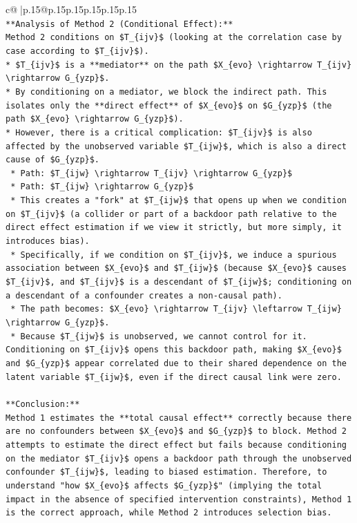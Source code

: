 \documentclass{article}
\begin{document}
{\begin{supertabular}{c@{$\;$}|p{.15\linewidth}@{}p{.15\linewidth}p{.15\linewidth}p{.15\linewidth}p{.15\linewidth}p{.15\linewidth}}
{{{\\ 
\texttt{**Analysis of Method 2 (Conditional Effect):**} \\
\texttt{Method 2 conditions on \$T\_\{ijv\}\$ (looking at the correlation case by case according to \$T\_\{ijv\}\$).} \\
\texttt{*   \$T\_\{ijv\}\$ is a **mediator** on the path \$X\_\{evo\} \textbackslash{}rightarrow T\_\{ijv\} \textbackslash{}rightarrow G\_\{yzp\}\$.} \\
\texttt{*   By conditioning on a mediator, we block the indirect path. This isolates only the **direct effect** of \$X\_\{evo\}\$ on \$G\_\{yzp\}\$ (the path \$X\_\{evo\} \textbackslash{}rightarrow G\_\{yzp\}\$).} \\
\texttt{*   However, there is a critical complication: \$T\_\{ijv\}\$ is also affected by the unobserved variable \$T\_\{ijw\}\$, which is also a direct cause of \$G\_\{yzp\}\$.} \\
\texttt{    *   Path: \$T\_\{ijw\} \textbackslash{}rightarrow T\_\{ijv\} \textbackslash{}rightarrow G\_\{yzp\}\$} \\
\texttt{    *   Path: \$T\_\{ijw\} \textbackslash{}rightarrow G\_\{yzp\}\$} \\
\texttt{    *   This creates a "fork" at \$T\_\{ijw\}\$ that opens up when we condition on \$T\_\{ijv\}\$ (a collider or part of a backdoor path relative to the direct effect estimation if we view it strictly, but more simply, it introduces bias).} \\
\texttt{    *   Specifically, if we condition on \$T\_\{ijv\}\$, we induce a spurious association between \$X\_\{evo\}\$ and \$T\_\{ijw\}\$ (because \$X\_\{evo\}\$ causes \$T\_\{ijv\}\$, and \$T\_\{ijv\}\$ is a descendant of \$T\_\{ijw\}\$; conditioning on a descendant of a confounder creates a non{-}causal path).} \\
\texttt{    *   The path becomes: \$X\_\{evo\} \textbackslash{}rightarrow T\_\{ijv\} \textbackslash{}leftarrow T\_\{ijw\} \textbackslash{}rightarrow G\_\{yzp\}\$.} \\
\texttt{    *   Because \$T\_\{ijw\}\$ is unobserved, we cannot control for it. Conditioning on \$T\_\{ijv\}\$ opens this backdoor path, making \$X\_\{evo\}\$ and \$G\_\{yzp\}\$ appear correlated due to their shared dependence on the latent variable \$T\_\{ijw\}\$, even if the direct causal link were zero.} \\
\\ 
\texttt{**Conclusion:**} \\
\texttt{Method 1 estimates the **total causal effect** correctly because there are no confounders between \$X\_\{evo\}\$ and \$G\_\{yzp\}\$ to block. Method 2 attempts to estimate the direct effect but fails because conditioning on the mediator \$T\_\{ijv\}\$ opens a backdoor path through the unobserved confounder \$T\_\{ijw\}\$, leading to biased estimation. Therefore, to understand "how \$X\_\{evo\}\$ affects \$G\_\{yzp\}\$" (implying the total impact in the absence of specified intervention constraints), Method 1 is the correct approach, while Method 2 introduces selection bias.} \\
}}}
\end{supertabular}}
\end{document}

